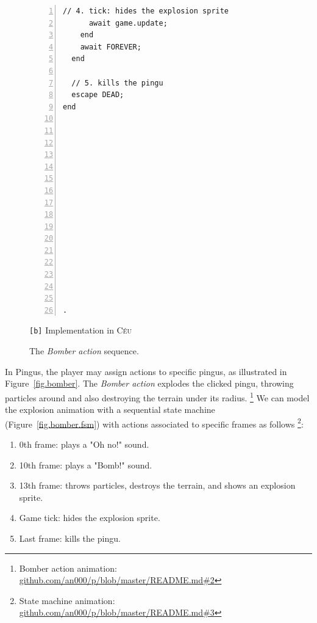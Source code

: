 \documentclass{vgtc}                          %
\newcommand{\CEU}{\textsc{C\'{e}u}\xspace}
\newcommand{\code}[1] {{\small{\texttt{#1}}}}
\newcommand{\bx}{\code{[b]}\xspace}
\begin{document}
\begin{figure}[th!]
\begin{minipage}[t]{0.50\linewidth}
\begin{lstlisting}[numbers=left,xleftmargin=3em]
      // 4. tick: hides the explosion sprite
      await game.update;
    end
    await FOREVER;
  end

  // 5. kills the pingu
  escape DEAD;
end
















.
\end{lstlisting}
\centering\small{\bx Implementation in \CEU}
\end{minipage}
\caption{ The \emph{Bomber action} sequence.
\label{lst.bomber}
}
\end{figure}

In Pingus, the player may assign actions to specific pingus, as illustrated in
Figure~\ref{fig.bomber}.
%
The \emph{Bomber action} explodes the clicked pingu, throwing particles around
and also destroying the terrain under its radius.%
\footnote{Bomber action animation: \url{github.com/an000/p/blob/master/README.md#2} }
%
We can model the explosion animation with a sequential state machine
(Figure~\ref{fig.bomber.fsm}) with actions associated to specific frames as
follows%
\footnote{State machine animation: \url{github.com/an000/p/blob/master/README.md#3} }:
%
\begin{enumerate}
\item 0th frame:  plays a "Oh no!" sound.
\item 10th frame: plays a "Bomb!" sound.
\item 13th frame: throws particles, destroys the terrain, and shows an
                  explosion sprite.
\item Game tick:  hides the explosion sprite.
\item Last frame: kills the pingu.
\end{enumerate}
\end{document}
